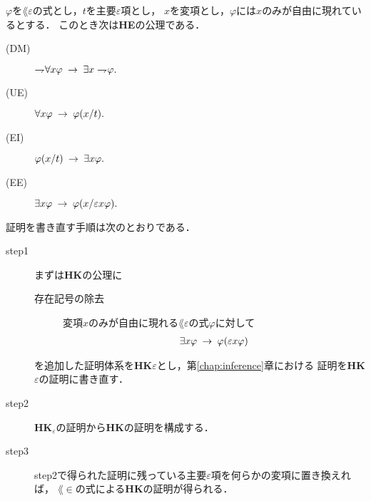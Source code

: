 	\begin{screen}
		\begin{logicalaxm}[{\bf HE}の公理(量化)]
			$\varphi$を$\lang{\varepsilon}の$式とし，$t$を主要$\varepsilon$項とし，
			$x$を変項とし，$\varphi$には$x$のみが自由に現れているとする．
			このとき次は{\bf HE}の公理である．
			\begin{description}
				\item[(DM)] $\rightharpoondown\hspace{-0.25em} \forall x \varphi
					\hspace{0.25em}\rightarrow\hspace{0.25em} \exists x \rightharpoondown\hspace{-0.25em} \varphi.$
				
				\item[(UE)] $\forall x \varphi \hspace{0.25em}\rightarrow\hspace{0.25em} \varphi(x/t).$
				
				\item[(EI)] $\varphi(x/t) \hspace{0.25em}\rightarrow\hspace{0.25em} \exists x \varphi.$
				
				\item[(EE)] $\exists x \varphi \hspace{0.25em}\rightarrow\hspace{0.25em} \varphi(x/\varepsilon x \varphi).$
			\end{description}
		\end{logicalaxm}
	\end{screen}
	
	証明を書き直す手順は次のとおりである．
	
	\begin{description}
		\item[step1]
			まずは{\bf HK}の公理に
			\begin{description}
				\item[存在記号の除去] 
					変項$x$のみが自由に現れる$\lang{\varepsilon}$の式$\varphi$に対して
					\begin{align}
						\exists x \varphi \hspace{0.25em}\rightarrow\hspace{0.25em} \varphi(\varepsilon x \varphi)
					\end{align}
			\end{description}
			を追加した証明体系を{\bf HK$\varepsilon$}とし，第\ref{chap:inference}章における
			証明を{\bf HK$\varepsilon$}の証明に書き直す．
			
		\item[step2]
			{\bf HK}${}_\varepsilon$の証明から{\bf HK}の証明を構成する．
			
		\item[step3]
			step2で得られた証明に残っている主要$\varepsilon$項を何らかの変項に置き換えれば，
			$\lang{\in}$の式による{\bf HK}の証明が得られる．
	\end{description}
	
